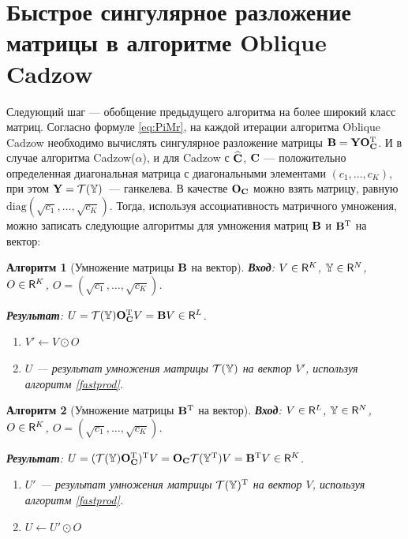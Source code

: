 \documentclass[12pt, specialist, subf,href,colorlinks=true,substylefile = spbu.rtx]{disser}
\newtheorem{algorithm}{Алгоритм}
\theoremstyle{remark}
\theoremstyle{definition}
\begin{document}
\section{Быстрое сингулярное разложение матрицы в алгоритме Oblique Cadzow}
Следующий шаг --- обобщение предыдущего алгоритма на более широкий класс матриц. Согласно формуле \eqref{eq:PiMr}, на каждой итерации алгоритма Oblique Cadzow необходимо вычислять сингулярное разложение матрицы $\mathbf{B} = \mathbf{Y} \mathbf{O}_{\mathbf{C}}^{\mathrm{T}}$. И в случае алгоритма Cadzow($\alpha$), и для Cadzow с $\widehat {\mathbf{C}}$, $\mathbf{C}$ --- положительно определенная диагональная матрица с диагональными элементами $(c_1, \ldots, c_K)$, при этом $\mathbf{Y} = \mathcal{T}(\mathbb{Y})$~--- ганкелева. В качестве $\mathbf{O}_{\mathbf{C}}$ можно взять матрицу, равную $\text{diag}(\sqrt{c_1}, \ldots, \sqrt{c_K})$. Тогда, используя ассоциативность матричного умножения, можно записать следующие алгоритмы для умножения матриц $\mathbf{B}$ и $\mathbf{B}^{\mathrm{T}}$ на вектор:
\begin{algorithm}[Умножение матрицы $\mathbf{B}$ на вектор]
	\textbf{Вход}: $V \in \mathsf{R}^K$, $\mathbb{Y} \in \mathsf{R}^N$, $O \in \mathsf{R}^K$, $O = (\sqrt{c_1}, \ldots, \sqrt{c_K})$.
	
	\textbf{Результат}:
	$U = \mathcal{T}(\mathbb{Y}) \mathbf{O}_{\mathbf{C}}^{\mathrm{T}} V = \mathbf{B} V \in \mathsf{R}^L$.
	
	\begin{enumerate}
		\item
		$V' \leftarrow V \odot O$
		\item
		$U$ --- результат умножения матрицы $\mathcal{T}(\mathbb{Y})$ на вектор $V'$, используя алгоритм \ref{fastprod}.
	\end{enumerate}
\end{algorithm}

\begin{algorithm}[Умножение матрицы $\mathbf{B}^{\mathrm{T}}$ на вектор]
	\textbf{Вход}: $V \in \mathsf{R}^L$, $\mathbb{Y} \in \mathsf{R}^N$, $O \in \mathsf{R}^K$, $O = (\sqrt{c_1}, \ldots, \sqrt{c_K})$.
	
	\textbf{Результат}:
	$U = (\mathcal{T}(\mathbb{Y}) \mathbf{O}_{\mathbf{C}}^{\mathrm{T}})^{\mathrm{T}} V = \mathbf{O}_{\mathbf{C}} \mathcal{T}(\mathbb{Y}^{\mathrm{T}}) V = \mathbf{B}^{\mathrm{T}} V \in \mathsf{R}^K$.
	
	\begin{enumerate}
		\item
		$U'$ --- результат умножения матрицы $\mathcal{T}(\mathbb{Y})^{\mathrm{T}}$ на вектор $V$, используя алгоритм \ref{fastprod}.
		\item
		$U \leftarrow U' \odot O$
	\end{enumerate}
\end{algorithm}
\end{document}
